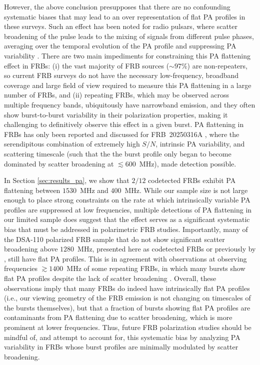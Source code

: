\documentclass[twocolumn, linenumbers]{aastex701}
\begin{document}
However, the above conclusion presupposes that there are no confounding systematic biases that may lead to an over representation of flat PA profiles in these surveys. Such an effect has been noted for radio pulsars, where scatter broadening of the pulse leads to the mixing of signals from different pulse phases, averaging over the temporal evolution of the PA profile and suppressing PA variability \citep[e.g., ][]{2003A&A...410..253L, 2023RAA....23j4002W, 2025arXiv250614519J}. There are two main impediments for constraining this PA flattening effect in FRBs: (i) the vast majority of FRB sources ($\sim 97$\%) are non-repeaters, so current FRB surveys do not have the necessary low-frequency, broadband coverage and large field of view required to measure this PA flattening in a large number of FRBs, and (ii) repeating FRBs, which may be observed across multiple frequency bands, ubiquitously have narrowband emission, and they often show burst-to-burst variability in their polarization properties, making it challenging to definitively observe this effect in a given burst. PA flattening in FRBs has only been reported and discussed for FRB~20250316A \citep{2025ApJ...989L..48C}, where the serendipitous combination of extremely high $S/N$, intrinsic PA variability, and scattering timescale (such that the the burst profile only began to become dominated by scatter broadening at $\lesssim 600$~MHz), made detection possible.

In Section \ref{sec:results_pa}, we show that $2/12$ codetected FRBs exhibit PA flattening between $1530$~MHz and $400$~MHz. While our sample size is not large enough to place strong constraints on the rate at which intrinsically variable PA profiles are suppressed at low frequencies, multiple detections of PA flattening in our limited sample does suggest that the effect serves as a significant systematic bias that must be addressed in polarimetric FRB studies. Importantly, many of the DSA-110 polarized FRB sample that do not show significant scatter broadening above $1280$~MHz, presented here as codetected FRBs or previously by \cite{2024ApJ...964..131S}, still have flat PA profiles. This is in agreement with observations at observing frequencies $\gtrsim 1400$~MHz of some repeating FRBs, in which many bursts show flat PA profiles despite the lack of scatter broadening \citep[e.g.,][]{2018Natur.553..182M, 2021NatAs...5..594N, 2021MNRAS.508.5354H, 2025ApJ...988..175L, 2026arXiv260320663W}. Overall, these observations imply that many FRBs do indeed have intrinsically flat PA profiles (i.e., our viewing geometry of the FRB emission is not changing on timescales of the bursts themselves), but that a fraction of bursts showing flat PA profiles are contaminants from PA flattening due to scatter broadening, which is more prominent at lower frequencies. Thus, future FRB polarization studies should be mindful of, and attempt to account for, this systematic bias by analyzing PA variability in FRBs whose burst profiles are minimally modulated by scatter broadening.
\end{document}
